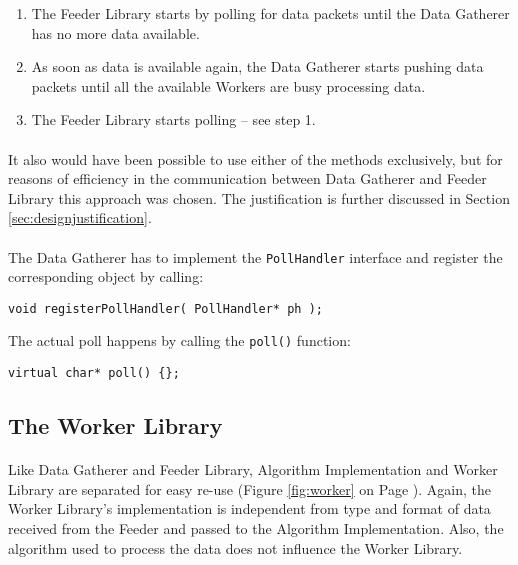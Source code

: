 \begin{enumerate}
\item The Feeder Library starts by polling for data packets until the Data Gatherer has no more data available.
\item As soon as data is available again, the Data Gatherer starts pushing data packets until all the available Workers are busy processing data.
\item The Feeder Library starts polling -- see step 1.
\end{enumerate}

\paragraph{}
It also would have been possible to use either of the methods exclusively, but for reasons of efficiency in the communication between Data Gatherer and Feeder Library this approach was chosen. The justification is further discussed in Section \ref{sec:designjustification}.

\paragraph{}
The Data Gatherer has to implement the \texttt{PollHandler} interface and register the corresponding object by calling:
\begin{flushleft}
\texttt{void registerPollHandler( PollHandler* ph );}
\end{flushleft}
The actual poll happens by calling the \texttt{poll()} function:
\begin{flushleft}
\texttt{virtual char* poll() \{\};}
\end{flushleft}


\subsection{The Worker Library}
\label{sec:workerlib}
\paragraph{}
Like Data Gatherer and Feeder Library, Algorithm Implementation and Worker Library are separated for easy re-use (Figure \ref{fig:worker} on Page \pageref{fig:worker}). Again, the Worker Library's implementation is independent from type and format of data received from the Feeder and passed to the Algorithm Implementation. Also, the algorithm used to process the data does not influence the Worker Library.

